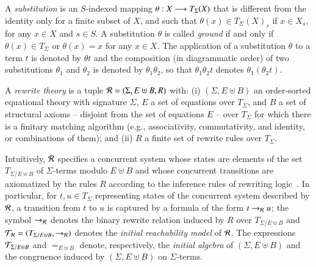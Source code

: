 A {\em substitution} is an $S$-indexed mapping
$\theta : X \longrightarrow T_\Sigma(X)$ that is different from the identity
only for a finite subset of $X$, and such that $\theta(x) \in
T_\Sigma(X)_s$ if $x \in X_s$, for any $x \in X$ and $s\in S$. 
%
A substitution $\theta$ is called {\em ground} if and only if $\theta(x) \in T_\Sigma$ or $\theta(x) = x$ for any $x \in X$.
%
The application of a substitution
$\theta$ to a term $t$ is denoted by $\theta t$ and the composition
(in diagrammatic order) 
of two substitutions $\theta_1$ and $\theta_2$
is denoted by $\theta_1\theta_2$,
so that $ \theta_1\theta_2 t$
denotes $\theta_1(\theta_2 t)$.

A \emph{rewrite theory} is a tuple $\mathcal{R} = (\Sigma, E \uplus B, R)$
with: (i) $(\Sigma, E \uplus B)$ an order-sorted equational theory
with signature $\Sigma$, $E$ a set of equations over $T_\Sigma$, 
and
$B$ a set of structural axioms -- disjoint from the set of equations
$E$ -- over $T_\Sigma$ 
for which there is a finitary matching
algorithm (e.g., associativity, commutativity, and identity, or
combinations of them); and (ii) $R$ a finite set of rewrite rules over $T_\Sigma$.

 Intuitively, $\mathcal{R}$ specifies a concurrent system whose
states are elements of the set $T_{\Sigma/E\uplus B}$ of
$\Sigma$-terms modulo $E \uplus B$ and whose concurrent transitions
are axiomatized by the %
rules $R$ according to the inference
rules of rewriting logic~\cite{bruni-semantics-2006}.  In particular,
for $t,u \in T_\Sigma$ representing states of the concurrent system
described by $\mathcal{R}$, a transition from $t$ to $u$ is captured by a
formula of the form $t \to_{\mathcal{R}} u$; the symbol $\to_{\mathcal{R}}$ denotes
the binary rewrite relation induced by $R$ over $T_{\Sigma/E\uplus B}$
and $\mathcal{T}_{\mathcal{R}} = (T_{\Sigma/E\uplus B},\rightarrow_{\mathcal{R}})$ denotes the
\emph{initial reachability model} of $\mathcal{R}$. %
The
expressions $\mathcal{T}_{\Sigma/E\uplus B}$ and $=_{E\uplus B}$ denote,
respectively, the \emph{initial algebra} of $(\Sigma,E\uplus B)$ and
the congruence induced by $(\Sigma,E\uplus B)$ on $\Sigma$-terms.

